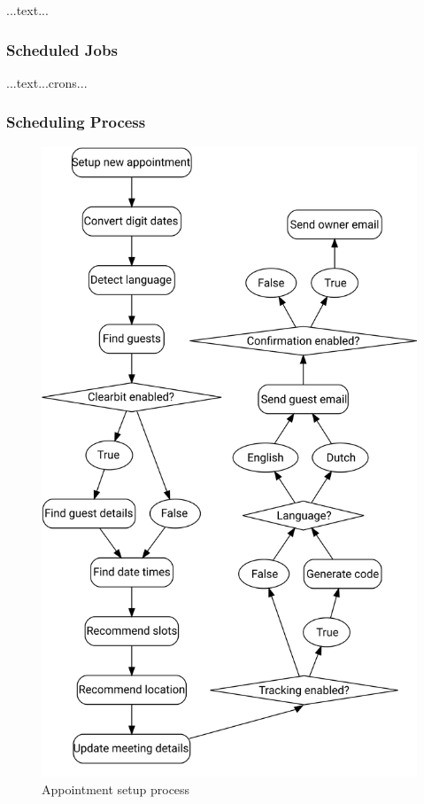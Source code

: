 \documentclass{article}
\begin{document}
...text...

\subsubsection{Scheduled Jobs}

...text...crons...

\subsubsection{Scheduling Process}

\begin{figure}\centering
	\includegraphics[scale=0.4]{schedule-process.png}
	\caption{Appointment setup process}
\end{figure}
\end{document}
